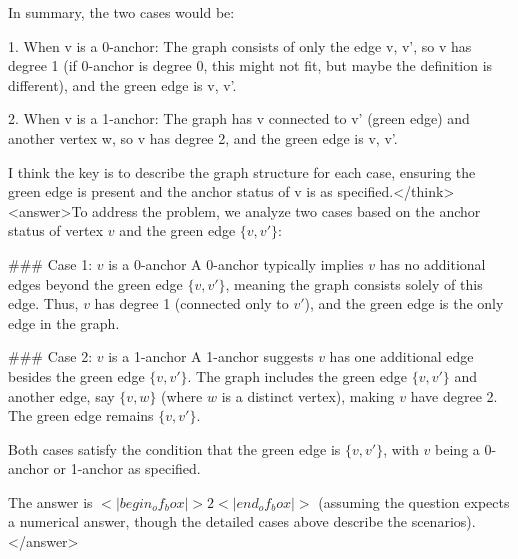 In summary, the two cases would be:

1. When v is a 0-anchor: The graph consists of only the edge {v, v'}, so v has degree 1 (if 0-anchor is degree 0, this might not fit, but maybe the definition is different), and the green edge is {v, v'}.

2. When v is a 1-anchor: The graph has v connected to v' (green edge) and another vertex w, so v has degree 2, and the green edge is {v, v'}.

I think the key is to describe the graph structure for each case, ensuring the green edge is present and the anchor status of v is as specified.</think><answer>To address the problem, we analyze two cases based on the anchor status of vertex \( v \) and the green edge \( \{v, v'\} \):  

### Case 1: \( v \) is a 0-anchor  
A 0-anchor typically implies \( v \) has no additional edges beyond the green edge \( \{v, v'\} \), meaning the graph consists solely of this edge. Thus, \( v \) has degree 1 (connected only to \( v' \)), and the green edge is the only edge in the graph.  

### Case 2: \( v \) is a 1-anchor  
A 1-anchor suggests \( v \) has one additional edge besides the green edge \( \{v, v'\} \). The graph includes the green edge \( \{v, v'\} \) and another edge, say \( \{v, w\} \) (where \( w \) is a distinct vertex), making \( v \) have degree 2. The green edge remains \( \{v, v'\} \).  

Both cases satisfy the condition that the green edge is \( \{v, v'\} \), with \( v \) being a 0-anchor or 1-anchor as specified.  

The answer is \(<|begin_of_box|>2<|end_of_box|>\) (assuming the question expects a numerical answer, though the detailed cases above describe the scenarios).</answer>